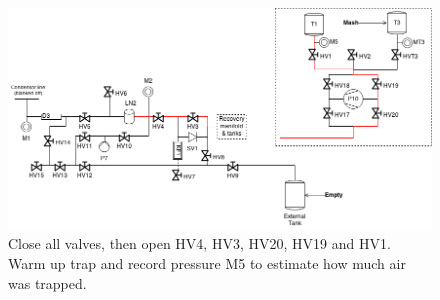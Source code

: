 \documentclass[a4paper,10pt]{article}
\begin{document}
\begin{figure}[htbp!]
 \centering
 \includegraphics[width=\textwidth]{./mash-cleaning-schematic-7-measure-trapped-gas}
 \caption{Close all valves, then open HV4, HV3, HV20, HV19 and HV1.  Warm up trap and record pressure M5 to estimate how much air was trapped.}
 \label{g}
\end{figure}
\end{document}
